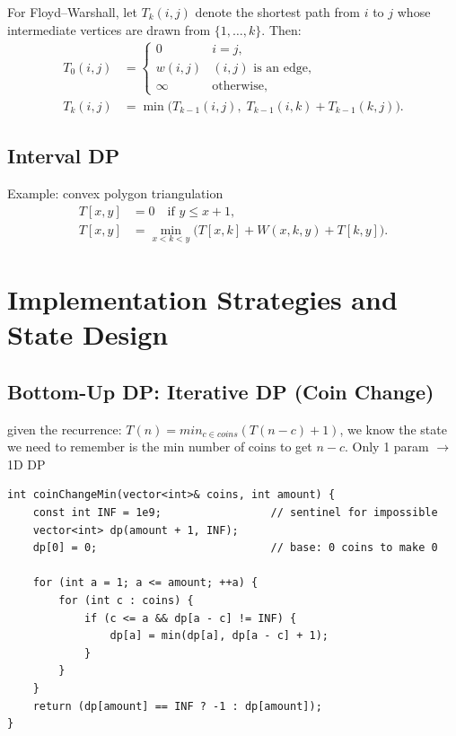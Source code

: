 \documentclass[9pt]{extarticle}
\begin{document}
For Floyd--Warshall, let \(T_k(i,j)\) denote the shortest path from \(i\) to
\(j\) whose intermediate vertices are drawn from \(\{1,\ldots,k\}\). Then:
\begin{align*}
    T_0(i,j) &=
    \begin{cases}
        0 & i=j,\\
        w(i,j) & (i,j)\text{ is an edge},\\
        \infty & \text{otherwise},
    \end{cases}\\
    T_k(i,j) &= \min\bigl(T_{k-1}(i,j),\;
        T_{k-1}(i,k)+T_{k-1}(k,j)\bigr).
\end{align*}

\subsection{Interval DP}

Example: convex polygon triangulation\\
\begin{align*}
T[x, y] &= 0 \quad \text{if } y \leq x + 1,\\
T[x, y] &= \min_{x<k<y}\bigl(T[x, k] + W(x, k, y) + T[k, y]\bigr).
\end{align*}

\section{Implementation Strategies and State Design}

\subsection{Bottom-Up DP: Iterative DP (Coin Change)}

given the recurrence: $T(n) = min_{c \in coins}(T(n - c) + 1)$, we know the state we need to remember is the min number of coins
to get $n - c$. Only 1 param $\rightarrow$ 1D DP
\begin{lstlisting}
int coinChangeMin(vector<int>& coins, int amount) {
    const int INF = 1e9;                 // sentinel for impossible
    vector<int> dp(amount + 1, INF);
    dp[0] = 0;                           // base: 0 coins to make 0

    for (int a = 1; a <= amount; ++a) {
        for (int c : coins) {
            if (c <= a && dp[a - c] != INF) {
                dp[a] = min(dp[a], dp[a - c] + 1);
            }
        }
    }
    return (dp[amount] == INF ? -1 : dp[amount]);
}
\end{lstlisting}
\end{document}
